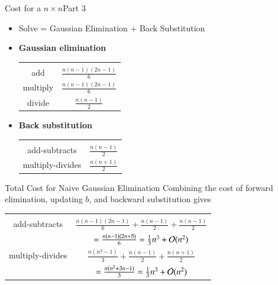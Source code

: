 \documentclass[10pt]{beamer}
\begin{document}

\begin{frame}{Cost for a $n\times n$}{Part 3}
\begin{itemize}
    \item Solve = Gaussian Elimination + Back Substitution  
    \item \textbf{Gaussian elimination}
    \begin{center}
\begin{tabular}{c c}\hline\\
add & $\frac{n(n-1)(2n-1)}{6}$ \\[4pt]
multiply & $\frac{n(n-1)(2n-1)}{6}$\\[4pt]
divide & $\frac{n(n-1)}{2}$ \\[4pt] 
\hline
\end{tabular}
\end{center}
    \item \textbf{Back substitution}
\begin{center}
\begin{tabular}{c c}\hline \\
add-subtracts & $\frac{n(n - 1)}{2}$\\[4pt]
multiply-divides & $\frac{n(n + 1)}{2}$\\[4pt]
\hline
\end{tabular}
\end{center}
\end{itemize}
\end{frame}
\begin{frame}{Total Cost for Naive Gaussian Elimination}
Combining the cost of forward elimination, updating $b$, and backward substitution
gives
\begin{center}
\begin{tabular}{c c}\hline\\
add-subtracts & $\frac{n(n-1)(2n-1)}{6} + \frac{n(n - 1)}{2} + \frac{n(n - 1)}{2}$\\[5pt]
&  $=\frac{n(n-1)(2n+5)}{6}= \frac{1}{3}n^3 + {\mathcal{O}}(n^2)$\\[6pt]
multiply-divides & $\frac{n(n^2 - 1)}{3}+\frac{n(n - 1)}{2}+ \frac{n(n + 1)}{2}$\\[5pt]
& $=\frac{n(n^2 + 3n-1)}{3}=\frac{1}{3}n^3 + {\mathcal{O}}(n^2)$\\[6pt]
\hline
\end{tabular}
\end{center}

\end{frame}
\end{document}
